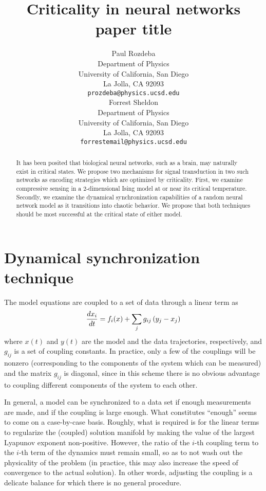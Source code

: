 \documentclass{article} %
\title{Criticality in neural networks paper title}
\author{
Paul Rozdeba%
\\
Department of Physics\\
University of California, San Diego\\
La Jolla, CA 92093 \\
\texttt{prozdeba@physics.ucsd.edu} \\
\And
Forrest Sheldon \\
Department of Physics\\
University of California, San Diego\\
La Jolla, CA 92093 \\
\texttt{forrestemail@physics.ucsd.edu} \\
}
\begin{document}
\maketitle

\begin{abstract}
It has been posited that biological neural networks, such as a brain, may naturally exist in critical states.  We propose two mechanisms for signal transduction in two such networks as encoding strategies which are optimized by criticality.  First, we examine compressive sensing in a 2-dimensional Ising model at or near its critical temperature.  Secondly, we examine the dynamical synchronization capabilities of a random neural network model as it transitions into chaotic behavior.  We propose that both techniques should be most successful at the critical state of either model.
\end{abstract}

\section{Dynamical synchronization technique}
The model equations are coupled to a set of data through a linear term as
\begin{align}
	\frac{d x_i}{d t} = f_i(x) + \sum_{j} g_{ij} \left(y_j - x_j\right)
\end{align}
where $x(t)$ and $y(t)$ are the model and the data trajectories, respectively, and $g_{ij}$ is a set of coupling constants.  In practice, only a few of the couplings will be nonzero (corresponding to the components of the system which can be measured) and the matrix $g_{ij}$ is diagonal, since in this scheme there is no obvious advantage to coupling different components of the system to each other.

In general, a model can be synchronized to a data set if enough measurements are made, and if the coupling is large enough.  What constitutes ``enough'' seems to come on a case-by-case basis.  Roughly, what is required is for the linear terms to regularize the (coupled) solution manifold by making the value of the largest Lyapunov exponent non-positive.  However, the ratio of the $i$-th coupling term to the $i$-th term of the dynamics must remain small, so as to not wash out the physicality of the problem (in practice, this may also increase the speed of convergence to the actual solution).  In other words, adjusting the coupling is a delicate balance for which there is no general procedure.
\end{document}
